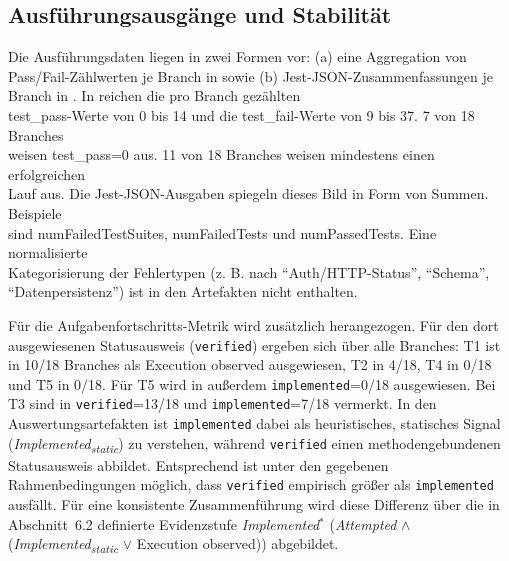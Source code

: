 \subsection{Ausführungsausgänge und Stabilität}
\label{sec:results_quality_tests}
\vspace{-0.5\baselineskip}
\noindent Die Ausführungsdaten liegen in zwei Formen vor: (a) eine Aggregation von Pass/Fail-\linebreak[4]
Zählwerten je Branch in  sowie (b) Jest-\linebreak[4]
JSON-Zusammenfassungen je Branch in . In  reichen die pro Branch gezählten\\
\mbox{test\_pass-Werte} von 0 bis 14 und die \mbox{test\_fail-Werte} von 9 bis 37. 7 von 18 Branches\\
weisen \mbox{test\_pass=0} aus. 11 von 18 Branches weisen mindestens einen erfolgreichen\\
Lauf aus. Die \mbox{Jest-JSON-Ausgaben} spiegeln dieses Bild in Form von Summen. Beispiele\\
sind numFailedTestSuites, numFailedTests und numPassedTests. Eine normalisierte\\
Kategorisierung der Fehlertypen (z. B. nach “Auth/HTTP-Status”, “Schema”, “Datenpersistenz”) ist in den Artefakten nicht enthalten.

Für die Aufgabenfortschritts-Metrik wird zusätzlich  herangezogen.
Für den dort ausgewiesenen Statusausweis (\texttt{verified}) ergeben sich über alle Branches: T1 ist in 10/18 Branches als Execution observed ausgewiesen, T2 in 4/18, T4 in 0/18 und T5 in 0/18.
Für T5 wird in  außerdem \texttt{implemented}=0/18 ausgewiesen.
Bei T3 sind in  \texttt{verified}=13/18 und \texttt{implemented}=7/18 vermerkt. In den Auswertungsartefakten ist \texttt{implemented} dabei als heuristisches, statisches Signal (\textit{Implemented\textsubscript{static}}) zu verstehen, während \texttt{verified} einen methodengebundenen Statusausweis abbildet. Entsprechend ist unter den gegebenen Rahmenbedingungen möglich, dass \texttt{verified} empirisch größer als \texttt{implemented} ausfällt. Für eine konsistente Zusammenführung wird diese Differenz über die in Abschnitt~6.2 definierte Evidenzstufe \textit{Implemented$^\ast$} (\space\textit{Attempted} $\wedge$ (\textit{Implemented\textsubscript{static}} $\vee$ Execution observed)) abgebildet.

